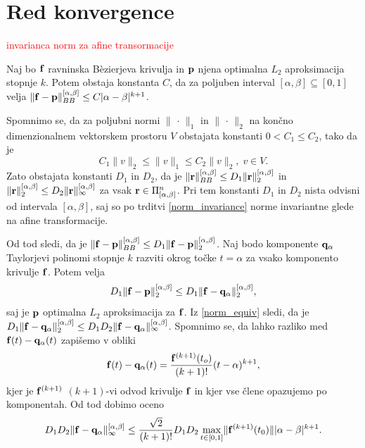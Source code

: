 
\section{Red konvergence}

\begin{trditev}\label{norm_invariance}

\textcolor{red}{invarianca norm za afine transormacije}
\end{trditev}
\proof

\endproof

\begin{lema}\label{prvalema}
Naj bo ${\bf f}$ ravninska B\`{e}zierjeva krivulja in ${\bf p}$ njena optimalna $L_2$ aproksimacija stopnje $k$. Potem obstaja konstanta $C$, da za poljuben interval $[\alpha,\beta]\subseteq[0,1]$ velja $\lVert {\bf f} - {\bf p} \rVert _{BB}^{[\alpha,\beta]} \leq C |\alpha - \beta|^{k+1}$.
\end{lema}
\proof
Spomnimo se, da za poljubni normi $\lVert\, \cdot\, \rVert _1$ in $\lVert\, \cdot \,\rVert _2$ na končno dimenzionalnem vektorskem prostoru $V$ obstajata konstanti $0 < C_1 \leq C_2$, tako da je 
\begin{equation}\label{norm_equiv}
C_1 \lVert v\rVert _2 \leq \lVert v\rVert _1 \leq C_2 \lVert v\rVert _2, \; v\in V.
\end{equation}
Zato obstajata konstanti $D_1$ in $D_2$, da je $\lVert {\bf r}\rVert _{BB}^{[\alpha,\beta]} \leq D_1 \lVert {\bf r}\rVert _2^{[\alpha,\beta]}$ in $\lVert {\bf r}\rVert _{2}^{[\alpha,\beta]} \leq D_2 \lVert {\bf r}\rVert _\infty^{[\alpha,\beta]}$ za vsak ${\bf r}\in  \Pi _{[\alpha,\beta]}^n$. Pri tem konstanti $D_1$ in $D_2$ nista odvisni od intervala $[\alpha,\beta]$, saj so po trditvi \ref{norm_invariance} norme invariantne glede na afine transformacije.

Od tod sledi, da je 
$\lVert {\bf f} - {\bf p} \rVert _{BB}^{[\alpha,\beta]} \leq D_1 \lVert {\bf f} - {\bf p} \rVert _{2}^{[\alpha,\beta]}$. Naj bodo komponente ${\bf q}_\alpha$ Taylorjevi polinomi stopnje $k$ razviti okrog točke $t = \alpha$ za vsako komponento krivulje ${\bf f}$. Potem velja
$$
D_1 \lVert {\bf f} - {\bf p} \rVert _{2}^{[\alpha,\beta]} \leq D_1 \lVert {\bf f} - {\bf q}_\alpha \rVert _{2}^{[\alpha,\beta]},
$$
saj je ${\bf p}$ optimalna $L_2$ aproksimacija za ${\bf f}$. Iz \ref{norm_equiv} sledi, da je 
$
D_1 \lVert {\bf f} - {\bf q}_\alpha \rVert _{2}^{[\alpha,\beta]} \leq D_1D_2 \lVert {\bf f} - {\bf q}_\alpha \rVert _{\infty}^{[\alpha,\beta]}
$. Spomnimo se, da lahko razliko med ${\bf f}(t) - {\bf q}_\alpha(t)$ zapišemo v obliki
$$
{\bf f}(t) - {\bf q}_\alpha(t) = \frac{{\bf f}^{(k+1)}(t_o)}{(k+1)!}(t-\alpha)^{k+1},
$$
kjer je ${\bf f}^{(k+1)}$ $(k+1)$-vi odvod krivulje ${\bf f}$ in kjer vse člene opazujemo po komponentah. Od tod dobimo oceno
$$
D_1D_2 \lVert {\bf f} - {\bf q}_\alpha \rVert _{\infty}^{[\alpha,\beta]} \leq
\frac{\sqrt{2}}{(k+1)!}D_1D_2\max _{t\in [0,1]} \lVert {\bf f}^{(k+1)}(t_0) \rVert |\alpha - \beta|^{k+1}.
$$
\endproof


